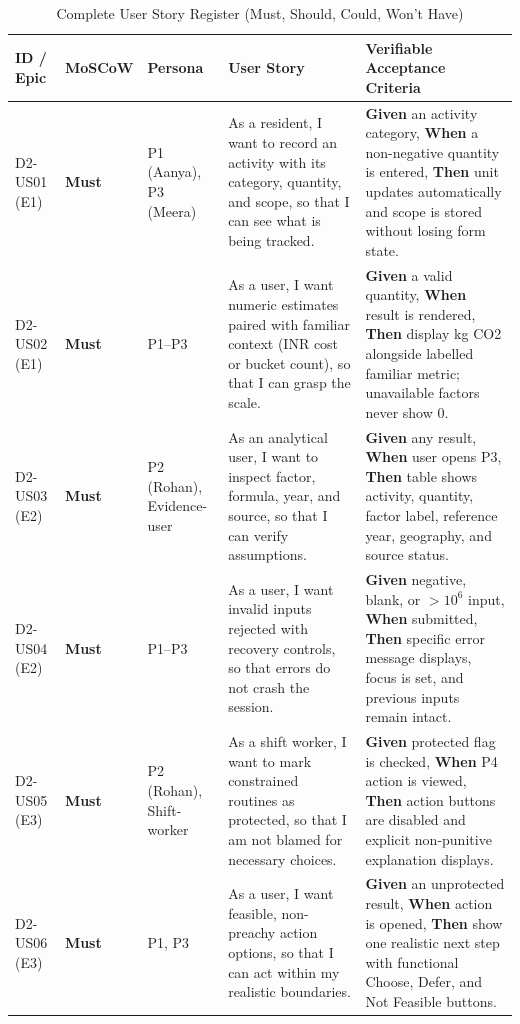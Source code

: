 \documentclass[12pt,a4paper]{article}
\begin{document}
\begin{table}[ht]
\centering
\scriptsize
\caption{Complete User Story Register (Must, Should, Could, Won't Have)}
\begin{tabularx}{\textwidth}{@{}p{1.2cm}p{1.2cm}p{1.5cm}Xp{5.0cm}@{}}
\toprule
\textbf{ID / Epic} & \textbf{MoSCoW} & \textbf{Persona} & \textbf{User Story} & \textbf{Verifiable Acceptance Criteria}\\
\midrule
D2-US01 (E1) & \textbf{Must} & P1 (Aanya), P3 (Meera) & As a resident, I want to record an activity with its category, quantity, and scope, so that I can see what is being tracked. & \textbf{Given} an activity category, \textbf{When} a non-negative quantity is entered, \textbf{Then} unit updates automatically and scope is stored without losing form state.\\
D2-US02 (E1) & \textbf{Must} & P1--P3 & As a user, I want numeric estimates paired with familiar context (INR cost or bucket count), so that I can grasp the scale. & \textbf{Given} a valid quantity, \textbf{When} result is rendered, \textbf{Then} display kg CO2 alongside labelled familiar metric; unavailable factors never show 0.\\
D2-US03 (E2) & \textbf{Must} & P2 (Rohan), Evidence-user & As an analytical user, I want to inspect factor, formula, year, and source, so that I can verify assumptions. & \textbf{Given} any result, \textbf{When} user opens P3, \textbf{Then} table shows activity, quantity, factor label, reference year, geography, and source status.\\
D2-US04 (E2) & \textbf{Must} & P1--P3 & As a user, I want invalid inputs rejected with recovery controls, so that errors do not crash the session. & \textbf{Given} negative, blank, or $>10^6$ input, \textbf{When} submitted, \textbf{Then} specific error message displays, focus is set, and previous inputs remain intact.\\
D2-US05 (E3) & \textbf{Must} & P2 (Rohan), Shift-worker & As a shift worker, I want to mark constrained routines as protected, so that I am not blamed for necessary choices. & \textbf{Given} protected flag is checked, \textbf{When} P4 action is viewed, \textbf{Then} action buttons are disabled and explicit non-punitive explanation displays.\\
D2-US06 (E3) & \textbf{Must} & P1, P3 & As a user, I want feasible, non-preachy action options, so that I can act within my realistic boundaries. & \textbf{Given} an unprotected result, \textbf{When} action is opened, \textbf{Then} show one realistic next step with functional Choose, Defer, and Not Feasible buttons.\\

\end{tabularx}
\end{table}
\end{document}
